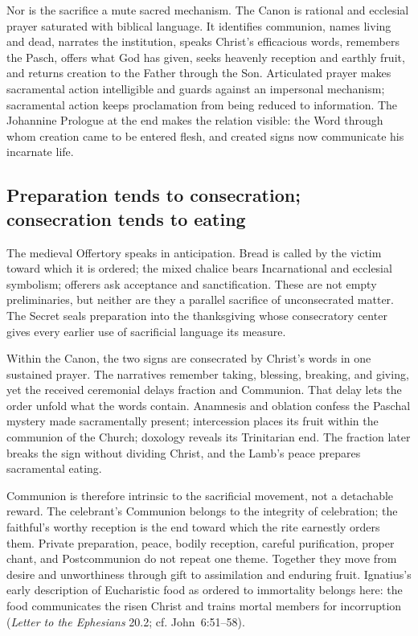 Nor is the sacrifice a mute sacred mechanism. The Canon is rational and ecclesial prayer saturated with biblical language. It identifies communion, names living and dead, narrates the institution, speaks Christ's efficacious words, remembers the Pasch, offers what God has given, seeks heavenly reception and earthly fruit, and returns creation to the Father through the Son. Articulated prayer makes sacramental action intelligible and guards against an impersonal mechanism; sacramental action keeps proclamation from being reduced to information. The Johannine Prologue at the end makes the relation visible: the Word through whom creation came to be entered flesh, and created signs now communicate his incarnate life.

\subsection{Preparation tends to consecration; consecration tends to eating}

The medieval Offertory speaks in anticipation. Bread is called by the victim toward which it is ordered; the mixed chalice bears Incarnational and ecclesial symbolism; offerers ask acceptance and sanctification. These are not empty preliminaries, but neither are they a parallel sacrifice of unconsecrated matter. The Secret seals preparation into the thanksgiving whose consecratory center gives every earlier use of sacrificial language its measure.

Within the Canon, the two signs are consecrated by Christ's words in one sustained prayer. The narratives remember taking, blessing, breaking, and giving, yet the received ceremonial delays fraction and Communion. That delay lets the order unfold what the words contain. Anamnesis and oblation confess the Paschal mystery made sacramentally present; intercession places its fruit within the communion of the Church; doxology reveals its Trinitarian end. The fraction later breaks the sign without dividing Christ, and the Lamb's peace prepares sacramental eating.

Communion is therefore intrinsic to the sacrificial movement, not a detachable reward. The celebrant's Communion belongs to the integrity of celebration; the faithful's worthy reception is the end toward which the rite earnestly orders them. Private preparation, peace, bodily reception, careful purification, proper chant, and Postcommunion do not repeat one theme. Together they move from desire and unworthiness through gift to assimilation and enduring fruit. Ignatius's early description of Eucharistic food as ordered to immortality belongs here: the food communicates the risen Christ and trains mortal members for incorruption (\emph{Letter to the Ephesians} 20.2; cf. John~6:51--58).


